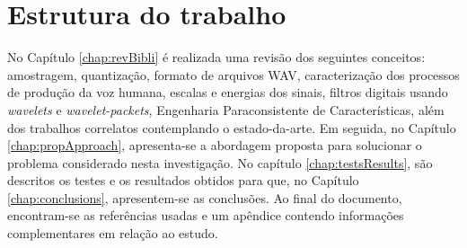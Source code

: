 	\section{Estrutura do trabalho}
		\par No Capítulo \ref{chap:revBibli} é realizada uma revisão dos seguintes conceitos: amostragem, quantização, formato de arquivos WAV, caracterização dos processos de produção da voz humana, escalas e energias dos sinais, filtros digitais usando \textit{wavelets} e \textit{wavelet-packets}, Engenharia Paraconsistente de Características, além dos trabalhos correlatos contemplando o estado-da-arte. Em seguida, no Capítulo \ref{chap:propApproach}, apresenta-se a abordagem proposta para solucionar o problema considerado nesta investigação. No capítulo \ref{chap:testsResults}, são descritos os testes e os resultados obtidos para que, no Capítulo \ref{chap:conclusions}, apresentem-se as conclusões. Ao final do documento, encontram-se as referências usadas e um apêndice contendo informações complementares em relação ao estudo.
